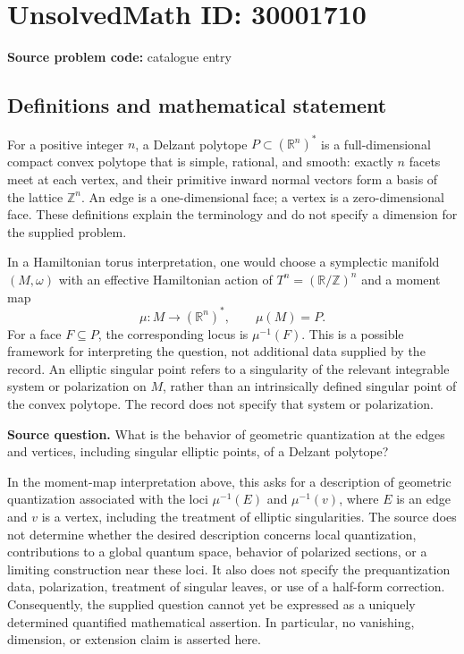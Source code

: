 \documentclass[11pt]{article}
\newcommand{\Z}{\mathbb{Z}}
\newcommand{\R}{\mathbb{R}}
\begin{document}
\section*{UnsolvedMath ID: 30001710}
\textbf{Source problem code:} catalogue entry
\subsection{Definitions and mathematical statement}
For a positive integer \(n\), a Delzant polytope \(P\subset (\R^n)^*\) is a full-dimensional compact convex polytope that is simple, rational, and smooth: exactly \(n\) facets meet at each vertex, and their primitive inward normal vectors form a basis of the lattice \(\Z^n\). An edge is a one-dimensional face; a vertex is a zero-dimensional face. These definitions explain the terminology and do not specify a dimension for the supplied problem.

In a Hamiltonian torus interpretation, one would choose a symplectic manifold \((M,\omega)\) with an effective Hamiltonian action of \(T^n=(\R/\Z)^n\) and a moment map
\[
\mu:M\longrightarrow(\R^n)^*,\qquad \mu(M)=P.
\]
For a face \(F\subseteq P\), the corresponding locus is \(\mu^{-1}(F)\). This is a possible framework for interpreting the question, not additional data supplied by the record. An elliptic singular point refers to a singularity of the relevant integrable system or polarization on \(M\), rather than an intrinsically defined singular point of the convex polytope. The record does not specify that system or polarization.

\textbf{Source question.} What is the behavior of geometric quantization at the edges and vertices, including singular elliptic points, of a Delzant polytope?

In the moment-map interpretation above, this asks for a description of geometric quantization associated with the loci \(\mu^{-1}(E)\) and \(\mu^{-1}(v)\), where \(E\) is an edge and \(v\) is a vertex, including the treatment of elliptic singularities. The source does not determine whether the desired description concerns local quantization, contributions to a global quantum space, behavior of polarized sections, or a limiting construction near these loci. It also does not specify the prequantization data, polarization, treatment of singular leaves, or use of a half-form correction. Consequently, the supplied question cannot yet be expressed as a uniquely determined quantified mathematical assertion. In particular, no vanishing, dimension, or extension claim is asserted here.
\end{document}
